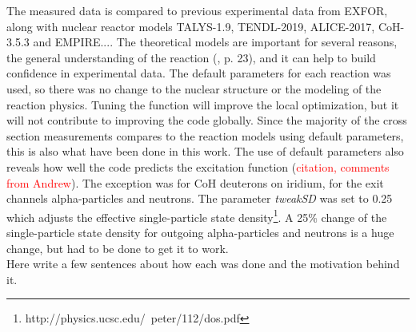 \noindent 
The measured data is compared to previous experimental data from EXFOR, along with nuclear reactor models TALYS-1.9, TENDL-2019, ALICE-2017\cite{Blann1996}, CoH-3.5.3 and EMPIRE.... The theoretical models are important for several reasons, the general understanding of the reaction (\cite{international2012iaea}, p. 23), and it can help to build confidence in experimental data. The default parameters for each reaction was used, so there was no change to the nuclear structure or the modeling of the reaction physics. Tuning the function will improve the local optimization, but it will not contribute to improving the code globally. Since the majority of the cross section measurements compares to the reaction models using default parameters, this is also what have been done in this work. The use of default parameters also reveals how well the code predicts the excitation function (\textcolor{red}{citation, comments from Andrew}). The exception was for CoH deuterons on iridium, for the exit channels alpha-particles and neutrons. The parameter \textit{tweakSD} was set to 0.25 which adjusts the effective single-particle state density\footnote{http://physics.ucsc.edu/~peter/112/dos.pdf}. A 25\% change of the single-particle state density for outgoing alpha-particles and neutrons is a huge change, but had to be done to get it to work. \\









Here write a few sentences about how each was done and the motivation behind it. 





